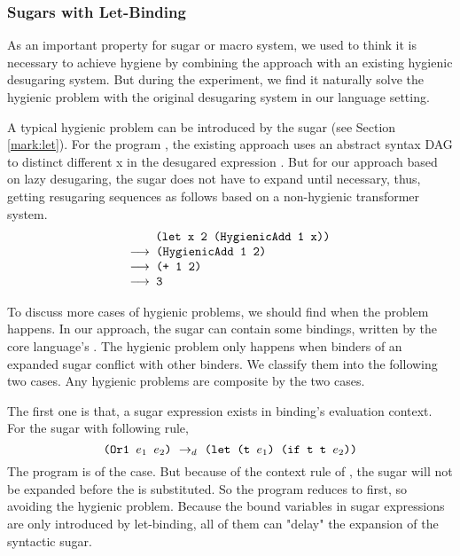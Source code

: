 \subsubsection{Sugars with Let-Binding}
\label{mark:hygienic}

As an important property for sugar or macro system, we used to think it is necessary to achieve hygiene by combining the approach with an existing hygienic desugaring system. But during the experiment, we find it naturally solve the hygienic problem with the original desugaring system in our language setting.

A typical hygienic problem can be introduced by the sugar  (see Section \ref{mark:let}). For the program , the existing approach uses an abstract syntax DAG to distinct different x in the desugared expression . But for our approach based on lazy desugaring, the  sugar does not have to expand until necessary, thus, getting resugaring sequences as follows based on a non-hygienic transformer system.
\[
	\begin{array}{l}
		\quad\;\;\Code{ (let x 2 (HygienicAdd 1 x))}\\
		\OneStep{ \Code{ (HygienicAdd 1 2)}}\\
		\OneStep{ \Code{ (+ 1 2)}}\\
		\OneStep{ \Code{ 3}}
	\end{array}
\]

 To discuss more cases of hygienic problems, we should find when the problem happens. In our approach, the sugar can contain some bindings, written by the core language's . The hygienic problem only happens when binders of an expanded sugar conflict with other binders. We classify them into the following two cases. Any hygienic problems are composite by the two cases.

The first one is that, a sugar expression exists in binding's evaluation context. For the sugar  with following rule,
\[\texttt{(Or1~$e_1$~$e_2$)} ~\rightarrow_d~ \texttt{(let (t $e_1$) (if t t $e_2$))}\]
The program  is of the case. But because of the context rule of , the sugar  will not be expanded before the  is substituted. So the program reduces to  first, so avoiding the hygienic problem. Because the bound variables in sugar expressions are only introduced by let-binding, all of them can "delay" the expansion of the syntactic sugar.

